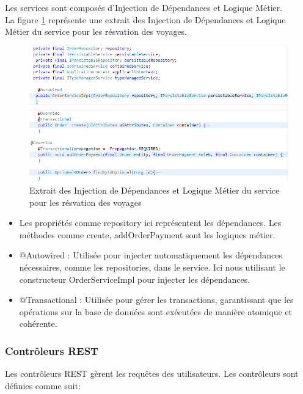 \documentclass[12pt]{report}
\begin{document}
			Les services sont composés d'Injection de Dépendances et Logique Métier.\\

			La figure \ref{fig:methService} représente une extrait des Injection de Dépendances et Logique Métier du service pour les résvation des voyages.
			
			\begin{figure}[h]
				\centering
				\includegraphics[width=\textwidth]{methService.jpg}
				\caption{Extrait des Injection de Dépendances et Logique Métier du service pour les résvation des voyages}
				\label{fig:methService}
			\end{figure}
			\FloatBarrier

			\begin{itemize}
				\item Les propriétés comme repository ici représentent les dépendances. Les méthodes comme create, addOrderPayment sont les logiques métier.
				\item @Autowired : Utilisée pour injecter automatiquement les dépendances nécessaires, comme les repositories, dans le service. Ici nous utilisant le constructeur OrderServiceImpl pour injecter les dépendances.
				\item @Transactional : Utilisée pour gérer les transactions, garantissant que les opérations sur la base de données sont exécutées de manière atomique et cohérente.
			\end{itemize}
			

			\subsubsection{Contrôleurs REST}
			
			\hspace{15pt} Les contrôleurs REST gèrent les requêtes des utilisateurs. Les contrôleurs sont définies comme suit:\\
\end{document}
